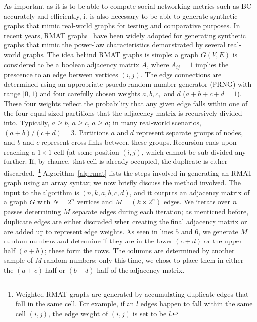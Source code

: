%
As important as it is to be able to compute social networking metrics such as
BC accurately and efficiently, it is also necessary to be able to generate
synthetic graphs that mimic real-world graphs for testing and comparative
purposes.
%
In recent years, RMAT graphs~\cite{Chakrabarti04:Recursive} have been widely
adopted for generating synthetic graphs that mimic the power-law
characteristics demonstrated by several real-world graphs.
%
The idea behind RMAT graphs is simple: a graph $G(V,E)$ is considered to be 
a boolean adjacency matrix $A$, where $A_{ij}=1$ implies the prescence to an 
edge between vertices $(i,j)$.
%
The edge connections are determined using an appropriate psuedo-random number 
generator (PRNG) with range $[0,1)$ and four carefully chosen weights $a,b,c,$
and $d$ ($a+b+c+d=1$).
%
These four weights reflect the probability that any given edge falls within one
of the four equal sized partitions that the adjacency matrix is recursively
divided into.
%
Typically, $a\ge{}b$, $a\ge{}c$, $a\ge{}d$; in many real-world scenarios,
$(a+b)/(c+d)=3$.
%
Partitions $a$ and $d$ represent separate groups of nodes, and $b$ and $c$
represent cross-links between these groups.
%
Recursion ends upon reaching a $1\times{}1$ cell (at some position $(i,j)$,
which cannot be sub-divided any further.
%
If, by chance, that cell is already occupied, the duplicate is either
discarded.~\footnote{Weighted RMAT graphs are generated by accumulating
duplicate edges that fall in the same cell. For example, if an $l$ edges happen
to fall within the same cell $(i,j)$, the edge weight of $(i,j)$ is set to be
$l$.}
%
%
Algorithm~\ref{alg:rmat} lists the steps involved in generating an RMAT graph
using an array syntax; we now briefly discuss the method involved.
%
The input to the algorithm is $(n,k,a,b,c,d)$, and it outputs an adjacency 
matrix of a graph $G$ with $N=2^n$ vertices and $M=(k\times{}2^n)$ edges.
%
We iterate over $n$ passes determining $M$ separate edges during each
iteration; as mentioned before, duplicate edges are either discraded when 
creating the final adjacency matrix or are added up to represent edge weights.
%
As seen in lines $5$ and $6$, we generate $M$ random numbers and determine if
they are in the lower $(c+d)$ or the upper half $(a+b)$; these form the rows.
%
The columns are determined by another sample of $M$ random numbers; only this 
time, we chose to place them in either the $(a+c)$ half or $(b+d)$ half of the 
adjacency matrix.
%


